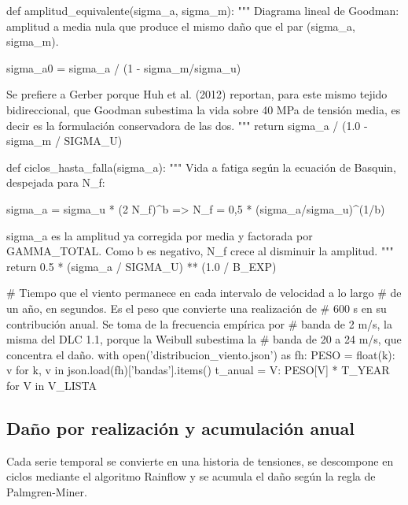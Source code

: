 \begin{pycode}
def amplitud_equivalente(sigma_a, sigma_m):
    """
    Diagrama lineal de Goodman: amplitud a media nula que produce el mismo
    daño que el par (sigma_a, sigma_m).

        sigma_a0 = sigma_a / (1 - sigma_m/sigma_u)

    Se prefiere a Gerber porque Huh et al. (2012) reportan, para este mismo
    tejido bidireccional, que Goodman subestima la vida sobre 40 MPa de
    tensión media, es decir es la formulación conservadora de las dos.
    """
    return sigma_a / (1.0 - sigma_m / SIGMA_U)


def ciclos_hasta_falla(sigma_a):
    """
    Vida a fatiga según la ecuación de Basquin, despejada para N_f:

        sigma_a = sigma_u * (2 N_f)^b     =>    N_f = 0,5 * (sigma_a/sigma_u)^(1/b)

    sigma_a es la amplitud ya corregida por media y factorada por
    GAMMA_TOTAL. Como b es negativo, N_f crece al disminuir la amplitud.
    """
    return 0.5 * (sigma_a / SIGMA_U) ** (1.0 / B_EXP)


# Tiempo que el viento permanece en cada intervalo de velocidad a lo largo
# de un año, en segundos. Es el peso que convierte una realización de
# 600 s en su contribución anual. Se toma de la frecuencia empírica por
# banda de 2 m/s, la misma del DLC 1.1, porque la Weibull subestima la
# banda de 20 a 24 m/s, que concentra el daño.
with open('distribucion_viento.json') as fh:
    PESO = {float(k): v for k, v in json.load(fh)['bandas'].items()}
t_anual = {V: PESO[V] * T_YEAR for V in V_LISTA}
\end{pycode}

\subsection*{Daño por realización y acumulación anual}

Cada serie temporal se convierte en una historia de tensiones, se descompone en ciclos mediante el algoritmo Rainflow y se acumula el daño según la regla de Palmgren-Miner.

